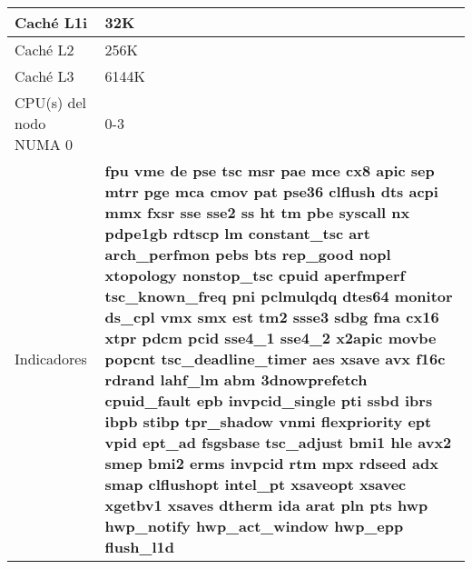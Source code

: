 \documentclass[12pt]{article}
\begin{document}
\begin{table}
\begin{tabular}{|l|p{5cm}|}
Caché L1i                           & 32K \\ \hline
Caché L2                            & 256K \\ \hline
Caché L3                            & 6144K \\ \hline
CPU(s) del nodo NUMA 0              & 0-3 \\ \hline
Indicadores                         & \textbf{fpu vme de pse tsc msr pae mce cx8 apic sep mtrr pge mca cmov pat pse36 clflush dts acpi mmx fxsr sse sse2 ss ht tm pbe syscall nx pdpe1gb rdtscp lm constant_tsc art arch_perfmon pebs bts rep_good nopl xtopology nonstop_tsc cpuid aperfmperf tsc_known_freq pni pclmulqdq dtes64 monitor ds_cpl vmx smx est tm2 ssse3 sdbg fma cx16 xtpr pdcm pcid sse4_1 sse4_2 x2apic movbe popcnt tsc_deadline_timer aes xsave avx f16c rdrand lahf_lm abm 3dnowprefetch cpuid_fault epb invpcid_single pti ssbd ibrs ibpb stibp tpr_shadow vnmi flexpriority ept vpid ept_ad fsgsbase tsc_adjust bmi1 hle avx2 smep bmi2 erms invpcid rtm mpx rdseed adx smap clflushopt intel_pt xsaveopt xsavec xgetbv1 xsaves dtherm ida arat pln pts hwp hwp_notify hwp_act_window hwp_epp flush_l1d}
\end{tabular}           
\end{table}
\end{document}
